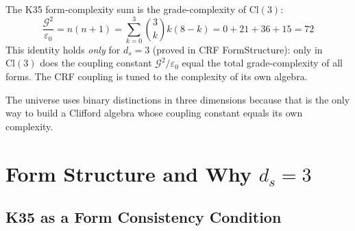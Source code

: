 \documentclass[12pt, a4paper]{article}
\begin{document}
\begin{keybox}[title={K35 Selects Clifford Algebra $\mathrm{Cl}(3)$ Uniquely}]
The K35 form-complexity sum is the grade-complexity of $\mathrm{Cl}(3)$:
\[
  \frac{\mathcal{G}^2}{\varepsilon_0} = n(n+1) = \sum_{k=0}^{3}\binom{3}{k}k(8-k)
  = 0+21+36+15 = 72
\]
This identity holds \emph{only} for $d_s = 3$ (proved in CRF FormStructure):
only in $\mathrm{Cl}(3)$ does the coupling constant $\mathcal{G}^2/\varepsilon_0$
equal the total grade-complexity of all forms. The CRF coupling is tuned to
the complexity of its own algebra.

The universe uses binary distinctions in three dimensions
because that is the only way to build a Clifford algebra
whose coupling constant equals its own complexity.
\end{keybox}

\section{Form Structure and Why $d_s = 3$}

\subsection{K35 as a Form Consistency Condition}
\end{document}
